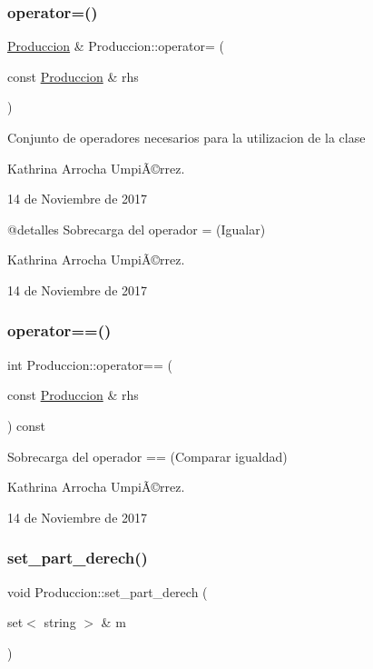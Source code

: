 \subsubsection{\texorpdfstring{operator=()}{operator=()}}
{\footnotesize\ttfamily \hyperlink{class_produccion}{Produccion} \& Produccion\+::operator= (\begin{DoxyParamCaption}\item[{const \hyperlink{class_produccion}{Produccion} \&}]{rhs }\end{DoxyParamCaption})}

Conjunto de operadores necesarios para la utilizacion de la clase

Kathrina Arrocha UmpiÃ©rrez.

14 de Noviembre de 2017 \begin{DoxyVerb} @detalles Sobrecarga del operador = (Igualar)
\end{DoxyVerb}


Kathrina Arrocha UmpiÃ©rrez.

14 de Noviembre de 2017 \mbox{\label{class_produccion_a42b1202a9a4904c19d6af60be18936cd}} 
\subsubsection{\texorpdfstring{operator==()}{operator==()}}
{\footnotesize\ttfamily int Produccion\+::operator== (\begin{DoxyParamCaption}\item[{const \hyperlink{class_produccion}{Produccion} \&}]{rhs }\end{DoxyParamCaption}) const}

Sobrecarga del operador == (Comparar igualdad)

Kathrina Arrocha UmpiÃ©rrez.

14 de Noviembre de 2017 \mbox{\label{class_produccion_ab3798028b2059c77c58514ef318ace5b}} 
\subsubsection{\texorpdfstring{set\+\_\+part\+\_\+derech()}{set\_part\_derech()}}
{\footnotesize\ttfamily void Produccion\+::set\+\_\+part\+\_\+derech (\begin{DoxyParamCaption}\item[{set$<$ string $>$ \&}]{m }\end{DoxyParamCaption})}

